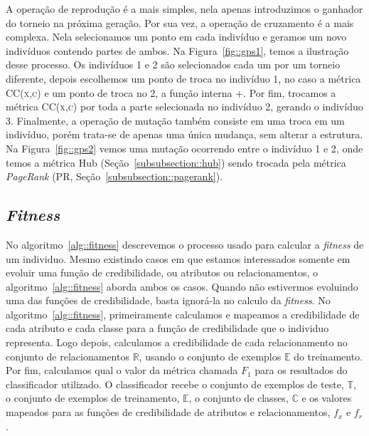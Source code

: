A operação de reprodução é a mais simples, nela apenas introduzimos o ganhador do torneio na próxima geração. Por sua vez, a operação de cruzamento é a mais complexa. Nela selecionamos um ponto em cada indivíduo e geramos um novo indivíduos contendo partes de ambos. Na Figura~\ref{fig::gps1}, temos a ilustração desse processo. 
Os indivíduos 1 e 2 são selecionados cada um por um torneio diferente, depois escolhemos um ponto de troca no indivíduo 1, no caso a métrica \textsc{CC(x,c)} e um ponto de troca no 2, a função interna +. Por fim, trocamos a métrica \textsc{CC(x,c)} por toda a parte selecionada no indivíduo 2, gerando o indivíduo 3. Finalmente, a operação de mutação também consiste em uma troca em um indivíduo, porém trata-se de apenas uma única mudança, sem alterar a estrutura. Na Figura~\ref{fig::gps2} vemos uma mutação ocorrendo entre o indivíduo 1 e 2, onde temos a métrica Hub (Seção~\ref{subsubsection::hub}) sendo trocada pela métrica \textit{PageRank} (\textsc{PR}, Seção~\ref{subsubsection::pagerank}).


\subsection{\textit{Fitness}}
\label{subsec::fitness}

No algoritmo~\ref{alg::fitness} descrevemos o processo usado para calcular a \textit{fitness} de um individuo. 
Mesmo existindo casos em que estamos interessados somente em evoluir uma função de credibilidade, ou atributos ou relacionamentos, o algoritmo~\ref{alg::fitness} aborda ambos os casos. 
Quando não estivermos evoluindo uma das funções de credibilidade, basta ignorá-la no calculo da \textit{fitness}.
No algoritmo~\ref{alg::fitness}, primeiramente calculamos e mapeamos a credibilidade de cada atributo e cada classe para a função de credibilidade que o individuo representa. Logo depois, calculamos a credibilidade de cada relacionamento no conjunto de relacionamentos $\mathbb{R}$, usando o conjunto de exemplos $\mathbb{E}$ do treinamento.
Por fim, calculamos qual o valor da métrica chamada \textit{$F_1$} para os resultados do classificador utilizado. 
O classificador recebe o conjunto de exemplos de teste, $\mathbb{T}$, o conjunto de exemplos de treinamento, $\mathbb{E}$, o conjunto de classes, $\mathbb{C}$ e os valores mapeados para as funções de credibilidade de atributos e relacionamentos, $f_x$ e $f_r$.

